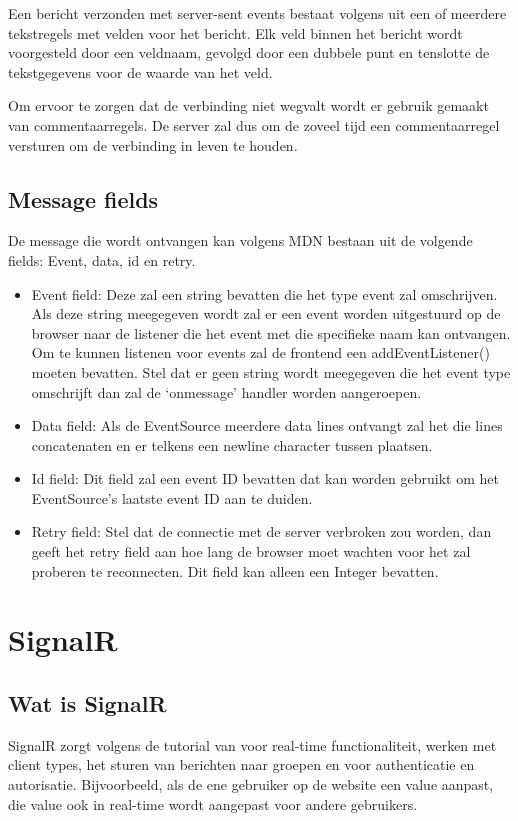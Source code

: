 Een bericht verzonden met server-sent events bestaat volgens \textcite{DevMozSSE} uit een of meerdere tekstregels met velden voor het bericht. Elk veld binnen het bericht wordt voorgesteld door een veldnaam, gevolgd door een dubbele punt en tenslotte de tekstgegevens voor de waarde van het veld.

Om ervoor te zorgen dat de verbinding niet wegvalt wordt er gebruik gemaakt van commentaarregels. De server zal dus om de zoveel tijd een commentaarregel versturen om de verbinding in leven te houden. 

\subsection{Message fields}
De message die wordt ontvangen kan volgens MDN \textcite{DevMozSSE} bestaan uit de volgende fields: Event, data, id en retry.
\begin{itemize}
    \item Event field: Deze zal een string bevatten die het type event zal omschrijven. Als deze string meegegeven wordt zal er een event worden uitgestuurd op de browser naar de listener die het event met die specifieke naam kan ontvangen. Om te kunnen listenen voor events zal de frontend een addEventListener() moeten bevatten. Stel dat er geen string wordt meegegeven die het event type omschrijft dan zal de ‘onmessage’ handler worden aangeroepen.
    \item Data field: Als de EventSource meerdere data lines ontvangt zal het die lines concatenaten en er telkens een newline character tussen plaatsen.
    \item Id field: Dit field zal een event ID bevatten dat kan worden gebruikt om het EventSource’s laatste event ID aan te duiden.
    \item Retry field: Stel dat de connectie met de server verbroken zou worden, dan geeft het retry field aan hoe lang de browser moet wachten voor het zal proberen te reconnecten. Dit field kan alleen een Integer bevatten.
\end{itemize}




\section{SignalR}
\subsection{Wat is SignalR}
SignalR zorgt volgens de tutorial van \textcite{PluralsightSignalR} voor real-time functionaliteit, werken met client types, het sturen van berichten naar groepen en voor authenticatie en autorisatie. Bijvoorbeeld, als de ene gebruiker op de website een value aanpast, die value ook in real-time wordt aangepast voor andere gebruikers. 


